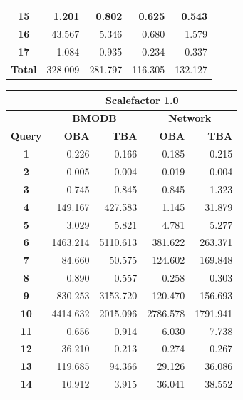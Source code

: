 \documentclass[a4paper]{article}
\begin{document}
\begin{figure}[h]
\begin{minipage}{0.5\linewidth}
\begin{tiny}
\begin{tabular}{|c|r|r|r|r|}
        \hline
        \textbf{15}&1.201&0.802&0.625&0.543\\
        \hline
        \textbf{16}&43.567&5.346&0.680&1.579\\
        \hline
        \textbf{17}&1.084&0.935&0.234&0.337\\
        \hline
        \textbf{Total}&328.009&281.797&116.305&132.127\\
        \hline
      \end{tabular}
    \end{tiny}
  \end{minipage} \hfill
\begin{minipage}{0.5\linewidth}
    \begin{tiny}
      \begin{tabular}{|c|r|r|r|r|}
        \hline
        &\multicolumn{4}{c|}{\textbf{Scalefactor 1.0}}\\
        \hline
        &\multicolumn{2}{c|}{\textbf{BMODB}}&\multicolumn{2}{c|}{\textbf{Network}}\\
        \hline
        \textbf{Query}&\textbf{OBA}&\textbf{TBA}&\textbf{OBA}&\textbf{TBA}\\
        \hline
        \textbf{1}&0.226&0.166&0.185&0.215\\
        \hline
        \textbf{2}&0.005&0.004&0.019&0.004\\
        \hline
        \textbf{3}&0.745&0.845&0.845&1.323\\
        \hline
        \textbf{4}&149.167&427.583&1.145&31.879\\
        \hline
         \textbf{5}&3.029&5.821&4.781&5.277\\
        \hline
        \textbf{6}&1463.214&5110.613&381.622&263.371\\
        \hline
        \textbf{7}&84.660&50.575&124.602&169.848\\
        \hline
        \textbf{8}&0.890&0.557&0.258&0.303\\
        \hline
        \textbf{9}&830.253&3153.720&120.470&156.693\\
        \hline
        \textbf{10}&4414.632&2015.096&2786.578&1791.941\\
        \hline
        \textbf{11}&0.656&0.914&6.030&7.738\\
        \hline
        \textbf{12}&36.210&0.213&0.274&0.267\\
        \hline
        \textbf{13}&119.685&94.366&29.126&36.086\\
        \hline
        \textbf{14}&10.912&3.915&36.041&38.552\\

\end{tabular}
\end{tiny}
\end{minipage}
\end{figure}
\end{document}
